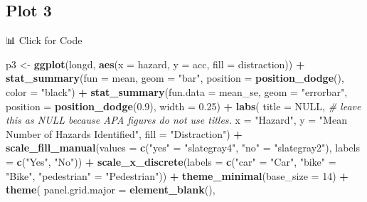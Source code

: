 \documentclass[
]{book}
\newenvironment{Shaded}{\begin{snugshade}}{\end{snugshade}}
\newcommand{\AttributeTok}[1]{\textcolor[rgb]{0.13,0.29,0.53}{#1}}
\newcommand{\CommentTok}[1]{\textcolor[rgb]{0.56,0.35,0.01}{\textit{#1}}}
\newcommand{\ConstantTok}[1]{\textcolor[rgb]{0.56,0.35,0.01}{#1}}
\newcommand{\DecValTok}[1]{\textcolor[rgb]{0.00,0.00,0.81}{#1}}
\newcommand{\FloatTok}[1]{\textcolor[rgb]{0.00,0.00,0.81}{#1}}
\newcommand{\FunctionTok}[1]{\textcolor[rgb]{0.13,0.29,0.53}{\textbf{#1}}}
\newcommand{\NormalTok}[1]{#1}
\newcommand{\OtherTok}[1]{\textcolor[rgb]{0.56,0.35,0.01}{#1}}
\newcommand{\SpecialCharTok}[1]{\textcolor[rgb]{0.81,0.36,0.00}{\textbf{#1}}}
\newcommand{\StringTok}[1]{\textcolor[rgb]{0.31,0.60,0.02}{#1}}
\let\oldsubsection\subsection
\renewcommand{\subsection}{\needspace{3\baselineskip}\oldsubsection}  %
\begin{document}
\subsection{Plot 3}\label{plot-3}

📊 Click for Code

\begin{Shaded}
\begin{Highlighting}[]
\NormalTok{p3 }\OtherTok{\textless{}{-}} \FunctionTok{ggplot}\NormalTok{(longd, }\FunctionTok{aes}\NormalTok{(}\AttributeTok{x =}\NormalTok{ hazard, }\AttributeTok{y =}\NormalTok{ acc, }\AttributeTok{fill =}\NormalTok{ distraction)) }\SpecialCharTok{+}
  \FunctionTok{stat\_summary}\NormalTok{(}\AttributeTok{fun =}\NormalTok{ mean, }\AttributeTok{geom =} \StringTok{"bar"}\NormalTok{, }\AttributeTok{position =} \FunctionTok{position\_dodge}\NormalTok{(), }\AttributeTok{color =} \StringTok{"black"}\NormalTok{) }\SpecialCharTok{+}
  \FunctionTok{stat\_summary}\NormalTok{(}\AttributeTok{fun.data =}\NormalTok{ mean\_se, }\AttributeTok{geom =} \StringTok{"errorbar"}\NormalTok{, }
               \AttributeTok{position =} \FunctionTok{position\_dodge}\NormalTok{(}\FloatTok{0.9}\NormalTok{), }\AttributeTok{width =} \FloatTok{0.25}\NormalTok{) }\SpecialCharTok{+}
  \FunctionTok{labs}\NormalTok{(}
    \AttributeTok{title =} \ConstantTok{NULL}\NormalTok{,   }\CommentTok{\# leave this as NULL because APA figures do not use titles.}
    \AttributeTok{x =} \StringTok{"Hazard"}\NormalTok{,}
    \AttributeTok{y =} \StringTok{"Mean Number of Hazards Identified"}\NormalTok{,}
    \AttributeTok{fill =} \StringTok{"Distraction"}\NormalTok{) }\SpecialCharTok{+}
  \FunctionTok{scale\_fill\_manual}\NormalTok{(}\AttributeTok{values =} \FunctionTok{c}\NormalTok{(}\StringTok{"yes"} \OtherTok{=} \StringTok{"slategray4"}\NormalTok{, }\StringTok{"no"} \OtherTok{=} \StringTok{"slategray2"}\NormalTok{), }
                    \AttributeTok{labels =} \FunctionTok{c}\NormalTok{(}\StringTok{"Yes"}\NormalTok{, }\StringTok{"No"}\NormalTok{)) }\SpecialCharTok{+}
  \FunctionTok{scale\_x\_discrete}\NormalTok{(}\AttributeTok{labels =} \FunctionTok{c}\NormalTok{(}\StringTok{"car"} \OtherTok{=} \StringTok{"Car"}\NormalTok{, }\StringTok{"bike"} \OtherTok{=} \StringTok{"Bike"}\NormalTok{, }\StringTok{"pedestrian"} \OtherTok{=} \StringTok{"Pedestrian"}\NormalTok{)) }\SpecialCharTok{+}
  \FunctionTok{theme\_minimal}\NormalTok{(}\AttributeTok{base\_size =} \DecValTok{14}\NormalTok{) }\SpecialCharTok{+}
  \FunctionTok{theme}\NormalTok{(}
    \AttributeTok{panel.grid.major =} \FunctionTok{element\_blank}\NormalTok{(),}

\end{Highlighting}
\end{Shaded}
\end{document}

